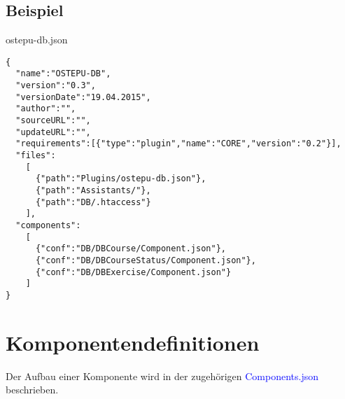 \documentclass[10pt,a4paper,final,parskip]{scrartcl}
\numberwithin{equation}{section}
\newcommand{\blau}[1]{\textcolor{blue}{#1}}
\begin{document}
\subsection{Beispiel}
\begin{minipage}{\textwidth}
ostepu-db.json
\begin{lstlisting}
{
  "name":"OSTEPU-DB",
  "version":"0.3",
  "versionDate":"19.04.2015",
  "author":"",
  "sourceURL":"",
  "updateURL":"",
  "requirements":[{"type":"plugin","name":"CORE","version":"0.2"}],
  "files":
    [
      {"path":"Plugins/ostepu-db.json"},
      {"path":"Assistants/"},
      {"path":"DB/.htaccess"}
    ],
  "components":
    [
      {"conf":"DB/DBCourse/Component.json"},
      {"conf":"DB/DBCourseStatus/Component.json"},
      {"conf":"DB/DBExercise/Component.json"}
    ]
}
\end{lstlisting}
\end{minipage}


\section{Komponentendefinitionen}
Der Aufbau einer Komponente wird in der zugehörigen \blau{Components.json} beschrieben.
\end{document}
